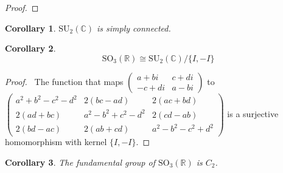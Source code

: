 \documentclass{book}
\let\qed\relax
\newtheorem{cor}{Corollary}[prop]
\theoremstyle{definition}
\newcommand{\inv}[1]{\ensuremath{{#1}^{-1}}}
\begin{document}
\begin{proof}
\pf
{}
\step{2}{$\inv{M} = M^\dagger$}
\qed
\end{proof}

\begin{cor}
$\mathrm{SU}_2(\mathbb{C})$ is simply connected.
\end{cor}


\begin{cor}
\[ \mathrm{SO}_3(\mathbb{R}) \cong \mathrm{SU}_2(\mathbb{C}) / \{ I, -I \} \]
\end{cor}

\begin{proof}
\pf\ The function that maps $\left( \begin{array}{cc}
a + b i & c + d i \\
-c + di & a - bi
\end{array} \right)$ to $\left( \begin{array}{ccc}
a^2 + b^2 - c^2 - d^2 & 2(bc - ad) & 2(ac + bd) \\
2(ad + bc) & a^2 - b^2 + c^2 - d^2 & 2(cd - ab) \\
2(bd - ac) & 2(ab + cd) & a^2 - b^2 - c^2 + d^2
\end{array} \right)$ is a surjective homomorphism with kernel $\{ I, -I \}$. \qed
\end{proof}

\begin{cor}
The fundamental group of $\mathrm{SO}_3(\mathbb{R})$ is $C_2$.
\end{cor}

\end{document}
